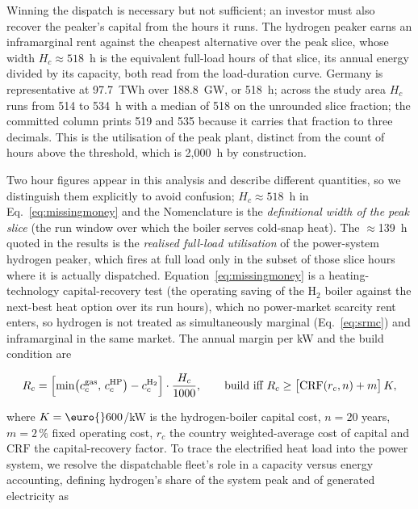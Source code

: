 Winning the dispatch is necessary but not sufficient; an investor must also recover the
peaker's capital from the hours it runs. The hydrogen peaker earns an inframarginal rent
against the cheapest alternative over the peak slice, whose width $H_c\approx518$~h is
the equivalent full-load hours of that slice, its annual energy divided by its capacity,
both read from the load-duration curve. Germany is representative at 97.7~TWh over 188.8~GW, or 518~h; across the study area
$H_c$ runs from 514 to 534~h with a median of 518 on the unrounded slice fraction; the
committed column prints 519 and 535 because it carries that fraction to three decimals. This is the utilisation of the peak plant, distinct from the count of hours above
the threshold, which is 2{,}000~h by construction.

Two hour figures appear in this analysis and describe different quantities, so we
distinguish them explicitly to avoid confusion; $H_c\approx518$~h in
Eq.~\eqref{eq:missingmoney} and the Nomenclature is the \emph{definitional width of the
peak slice} (the run window over which the boiler serves cold-snap heat). The $\approx$139~h quoted in the results is the \emph{realised full-load utilisation} of the
power-system hydrogen peaker, which fires at full load only in the subset of those slice
hours where it is actually dispatched. Equation~\eqref{eq:missingmoney} is a
heating-technology capital-recovery test (the operating saving of the H$_2$ boiler
against the next-best heat option over its run hours), which no power-market scarcity
rent enters, so hydrogen is not treated as simultaneously marginal (Eq.~\eqref{eq:srmc})
and inframarginal in the same market. The annual margin per kW and the build condition
are

\begin{equation}
\label{eq:missingmoney}
 R_{c} = \Bigl[\min\bigl(c^{\mathrm{gas}}_{c},\, c^{\mathrm{HP}}_{c}\bigr)
 - c^{\mathrm{H_2}}_{c}\Bigr] \cdot \frac{H_{c}}{1000},
 \qquad
 \text{build iff } R_{c} \geq
 \bigl[\mathrm{CRF}(r_{c}, n) + m\bigr]\, K,
\end{equation}

\noindent where $K=\text{\euro{}}600$/kW is the hydrogen-boiler capital cost, $n{=}20$
years, $m{=}2\,\%$ fixed operating cost, $r_{c}$ the country weighted-average cost of
capital and $\mathrm{CRF}$ the capital-recovery factor. To trace the electrified heat
load into the power system, we resolve the dispatchable fleet's role in a capacity
versus energy accounting, defining hydrogen's share of the system peak and of
generated electricity as

